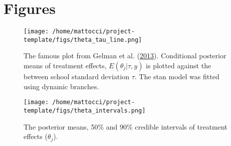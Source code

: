 \documentclass[
  12pt,
  letterpaper,
  DIV=11,
  numbers=noendperiod]{scrartcl}
\begin{document}
\newpage

\hypertarget{figures-1}{%
\section{Figures}\label{figures-1}}

\begin{figure}

{\centering \texttt{[image: /home/mattocci/project-template/figs/theta\_tau\_line.png]}

}

\caption{\label{fig-theta_tau}The famous plot from Gelman et al.
(\protect\hyperlink{ref-Gelman2013}{2013}). Conditional posterior means
of treatment effects, \(E(\theta_j | \tau, y)\) is plotted against the
between school standard deviation \(\tau\). The stan model was fitted
using dynamic branches.}

\end{figure}

\newpage

\begin{figure}

{\centering \texttt{[image: /home/mattocci/project-template/figs/theta\_intervals.png]}

}

\caption{\label{fig-theta_intervals}The posterior means, 50\% and 90\%
credible intervals of treatment effects (\(\theta_j\)).}

\end{figure}
\end{document}
